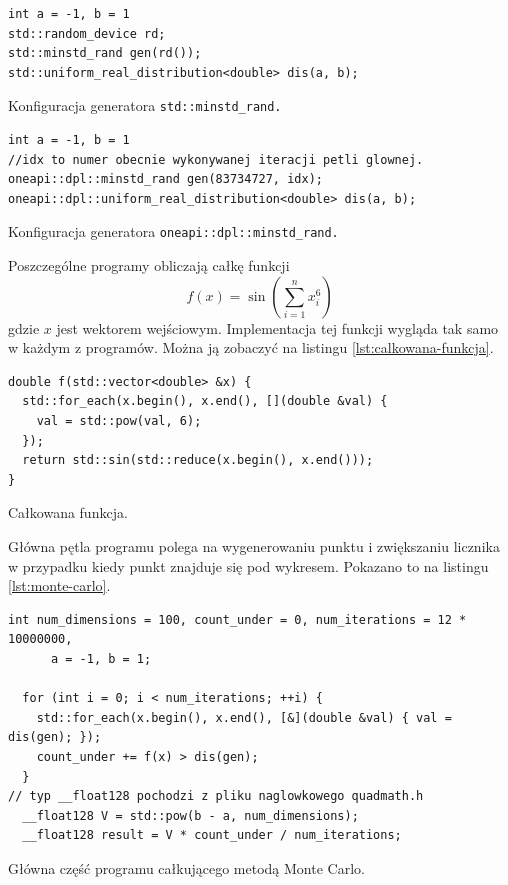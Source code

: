 \documentclass[a4paper,12pt]{book} %
\begin{document}
\begin{lstfloat}
\lstset{language=C++}
\begin{lstlisting}[frame=single]
int a = -1, b = 1
std::random_device rd;
std::minstd_rand gen(rd());
std::uniform_real_distribution<double> dis(a, b);
\end{lstlisting}
\caption{Konfiguracja generatora \texttt{std::minstd\_rand.}}
\label{lst:minstd-rand}
\end{lstfloat}

\begin{lstfloat}
\lstset{language=C++}
\begin{lstlisting}[frame=single]
int a = -1, b = 1
//idx to numer obecnie wykonywanej iteracji petli glownej.
oneapi::dpl::minstd_rand gen(83734727, idx);
oneapi::dpl::uniform_real_distribution<double> dis(a, b);
\end{lstlisting}
\caption{Konfiguracja generatora \texttt{oneapi::dpl::minstd\_rand.}}
\label{lst:minst-rand-SYCL}
\end{lstfloat}

Poszczególne programy obliczają całkę funkcji
$$ f(x) = \sin{(\sum^n_{i=1}x_i^6)} $$ gdzie $x$ jest wektorem wejściowym.
Implementacja tej funkcji wygląda tak samo w każdym z programów. Można ją zobaczyć na listingu \ref{lst:calkowana-funkcja}.

\begin{lstfloat}
\lstset{language=C++}
\begin{lstlisting}[frame=single]
double f(std::vector<double> &x) {
  std::for_each(x.begin(), x.end(), [](double &val) {
    val = std::pow(val, 6);
  });
  return std::sin(std::reduce(x.begin(), x.end()));
}
\end{lstlisting}
\caption{Całkowana funkcja.}
\label{lst:calkowana-funkcja}
\end{lstfloat}

Główna pętla programu polega na wygenerowaniu punktu i zwiększaniu licznika w przypadku kiedy punkt znajduje się pod wykresem. Pokazano to na listingu \ref{lst:monte-carlo}.

\begin{lstfloat}
\lstset{language=C++}
\begin{lstlisting}[frame=single]
  int num_dimensions = 100, count_under = 0, num_iterations = 12 * 10000000,
      a = -1, b = 1;

  for (int i = 0; i < num_iterations; ++i) {
    std::for_each(x.begin(), x.end(), [&](double &val) { val = dis(gen); });
    count_under += f(x) > dis(gen);
  }
// typ __float128 pochodzi z pliku naglowkowego quadmath.h
  __float128 V = std::pow(b - a, num_dimensions);
  __float128 result = V * count_under / num_iterations;
\end{lstlisting}
\caption{Główna część programu całkującego metodą Monte Carlo.}
\label{lst:monte-carlo}
\end{lstfloat}
\end{document}
